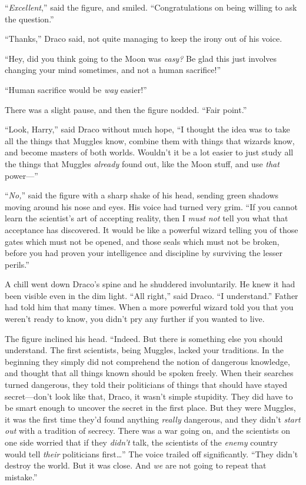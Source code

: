 “\emph{Excellent},” said the figure, and smiled. “Congratulations on being
willing to ask the question.”

“Thanks,” Draco said, not quite managing to keep the irony out of his voice.

“Hey, did you think going to the Moon was \emph{easy?} Be glad this just
involves changing your mind sometimes, and not a human sacrifice!”

“Human sacrifice would be \emph{way} easier!”

There was a slight pause, and then the figure nodded. “Fair point.”

“Look, Harry,” said Draco without much hope, “I thought the idea was to take
all the things that Muggles know, combine them with things that wizards know,
and become masters of both worlds. Wouldn’t it be a lot easier to just study
all the things that Muggles \emph{already} found out, like the Moon stuff, and
use \emph{that} power—”

“\emph{No,}” said the figure with a sharp shake of his head, sending green
shadows moving around his nose and eyes. His voice had turned very grim. “If
you cannot learn the scientist’s art of accepting reality, then I \emph{must
not} tell you what that acceptance has discovered. It would be like a powerful
wizard telling you of those gates which must not be opened, and those seals
which must not be broken, before you had proven your intelligence and
discipline by surviving the lesser perils.”

A chill went down Draco’s spine and he shuddered involuntarily. He knew it had
been visible even in the dim light. “All right,” said Draco. “I understand.”
Father had told him that many times. When a more powerful wizard told you that
you weren’t ready to know, you didn’t pry any further if you wanted to live.

The figure inclined his head. “Indeed. But there is something else you should
understand. The first scientists, being Muggles, lacked your traditions. In the
beginning they simply did not comprehend the notion of dangerous knowledge, and
thought that all things known should be spoken freely. When their searches
turned dangerous, they told their politicians of things that should have stayed
secret—don’t look like that, Draco, it wasn’t simple stupidity. They did have
to be smart enough to uncover the secret in the first place. But they were
Muggles, it was the first time they’d found anything \emph{really} dangerous,
and they didn’t \emph{start out} with a tradition of secrecy. There was a war
going on, and the scientists on one side worried that if they \emph{didn’t}
talk, the scientists of the \emph{enemy} country would tell \emph{their}
politicians first…” The voice trailed off significantly. “They didn’t
destroy the world. But it was close. And \emph{we} are not going to repeat that
mistake.”

